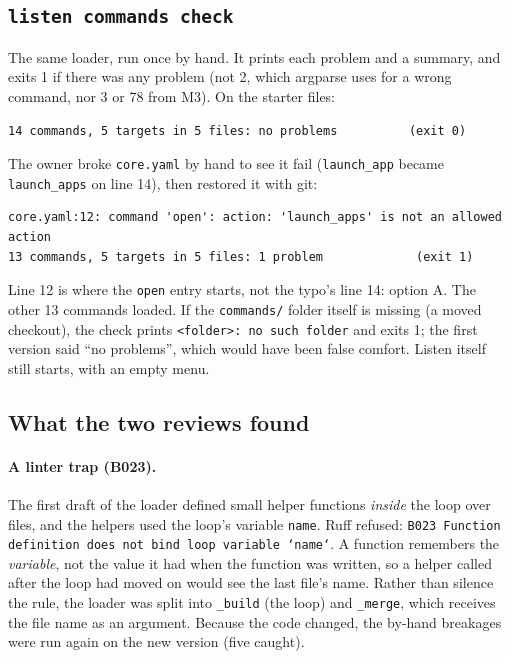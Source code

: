 \documentclass[11pt,a4paper]{article}
\begin{document}
\subsection{\texttt{listen commands check}}
The same loader, run once by hand. It prints each problem and a summary, and exits 1 if there
was any problem (not 2, which argparse uses for a wrong command, nor 3 or 78 from M3). On the
starter files:
\begin{lstlisting}
14 commands, 5 targets in 5 files: no problems          (exit 0)
\end{lstlisting}
\noindent The owner broke \texttt{core.yaml} by hand to see it fail (\texttt{launch\_app} became
\texttt{launch\_apps} on line 14), then restored it with git:
\begin{lstlisting}
core.yaml:12: command 'open': action: 'launch_apps' is not an allowed action
13 commands, 5 targets in 5 files: 1 problem             (exit 1)
\end{lstlisting}
\noindent Line 12 is where the \texttt{open} entry starts, not the typo's line 14: option A. The
other 13 commands loaded. If the \texttt{commands/} folder itself is missing (a moved checkout),
the check prints \texttt{<folder>: no such folder} and exits 1; the first version said ``no
problems'', which would have been false comfort. Listen itself still starts, with an empty menu.

\subsection{What the two reviews found}
\paragraph{A linter trap (B023).} The first draft of the loader defined small helper functions
\emph{inside} the loop over files, and the helpers used the loop's variable \texttt{name}. Ruff
refused: \texttt{B023 Function definition does not bind loop variable `name`}. A function
remembers the \emph{variable}, not the value it had when the function was written, so a helper
called after the loop had moved on would see the last file's name. Rather than silence the rule,
the loader was split into \texttt{\_build} (the loop) and \texttt{\_merge}, which receives the file
name as an argument. Because the code changed, the by-hand breakages were run again on the new
version (five caught).
\end{document}
